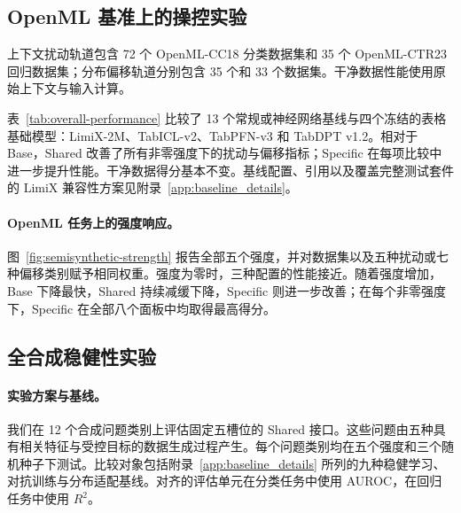 \subsection{OpenML 基准上的操控实验}
\label{sec:semi_synthetic_results}

上下文扰动轨道包含 72 个 OpenML-CC18 分类数据集和 35 个 OpenML-CTR23 回归数据集；分布偏移轨道分别包含 35 个和 33 个数据集。干净数据性能使用原始上下文与输入计算。

\nocite{cox1958binary,hoerl1970ridge,cortes1995svm,drucker1996svr,
cover1967knn,breiman2001randomforests,ke2017lightgbm,
prokhorenkova2018catboost,chen2016xgboost,rumelhart1986backprop,
gorishniy2021fttransformer,gorishniy2025tabm,thielmann2024tabularnn,
ahamed2024mambatab,holzmueller2024realmlp,qu2026tabiclv2,
grinsztajn2026tabpfn3technicalreport,wang2026limix2m,ma2025tabdpt}

表~\ref{tab:overall-performance} 比较了 13 个常规或神经网络基线与四个冻结的表格基础模型：LimiX-2M、TabICL-v2、TabPFN-v3 和 TabDPT v1.2。相对于 Base，Shared 改善了所有非零强度下的扰动与偏移指标；Specific 在每项比较中进一步提升性能。干净数据得分基本不变。基线配置、引用以及覆盖完整测试套件的 LimiX 兼容性方案见附录~\ref{app:baseline_details}。

\paragraph{OpenML 任务上的强度响应。}
图~\ref{fig:semisynthetic-strength} 报告全部五个强度，并对数据集以及五种扰动或七种偏移类别赋予相同权重。强度为零时，三种配置的性能接近。随着强度增加，Base 下降最快，Shared 持续减缓下降，Specific 则进一步改善；在每个非零强度下，Specific 在全部八个面板中均取得最高得分。

\subsection{全合成稳健性实验}
\label{sec:results}

\paragraph{实验方案与基线。}
我们在 12 个合成问题类别上评估固定五槽位的 Shared 接口。这些问题由五种具有相关特征与受控目标的数据生成过程产生。每个问题类别均在五个强度和三个随机种子下测试。比较对象包括附录~\ref{app:baseline_details} 所列的九种稳健学习、对抗训练与分布适配基线。对齐的评估单元在分类任务中使用 AUROC，在回归任务中使用 $R^2$。

